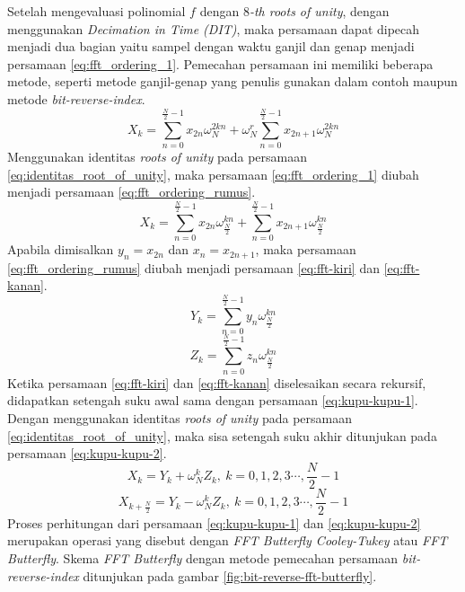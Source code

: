 Setelah mengevaluasi polinomial $ f $ dengan $8$\textit{-th roots of unity}, dengan menggunakan \textit{Decimation in Time (DIT)}, maka persamaan dapat dipecah menjadi dua bagian yaitu sampel dengan waktu ganjil dan genap menjadi persamaan \eqref{eq:fft_ordering_1}. Pemecahan persamaan ini memiliki beberapa metode, seperti metode ganjil-genap yang penulis gunakan dalam contoh maupun metode \textit{bit-reverse-index}. 
\begin{equation}
	X_k = \sum_{n=0}^{\frac{N}{2}-1} x_{2n}\omega_{N}^{2kn} + \omega_N^r \sum_{n=0}^{\frac{N}{2}-1} x_{2n+1}\omega_{N}^{2kn}
	\label{eq:fft_ordering_1}
\end{equation}
Menggunakan identitas \textit{roots of unity} pada persamaan \eqref{eq:identitas_root_of_unity}, maka persamaan \eqref{eq:fft_ordering_1} diubah menjadi persamaan \eqref{eq:fft_ordering_rumus}.
\begin{equation}
	X_k = \sum_{n=0}^{\frac{N}{2}-1} x_{2n}\omega_{\frac{N}{2}}^{kn} + \sum_{n=0}^{\frac{N}{2}-1} x_{2n+1}\omega_{\frac{N}{2}}^{kn}
	\label{eq:fft_ordering_rumus}
\end{equation}
Apabila dimisalkan $ y_n = x_{2n} $ dan $ x_n = x_{2n+1} $, maka persamaan \eqref{eq:fft_ordering_rumus} diubah menjadi persamaan \eqref{eq:fft-kiri} dan \eqref{eq:fft-kanan}.
\begin{equation}
	Y_k = \sum_{n=0}^{\frac{N}{2}-1} y_{n}\omega_{\frac{N}{2}}^{kn}
	\label{eq:fft-kiri}
\end{equation}
\begin{equation}
	Z_k = \sum_{n=0}^{\frac{N}{2}-1} z_{n}\omega_{\frac{N}{2}}^{kn}
	\label{eq:fft-kanan}
\end{equation}
Ketika persamaan \eqref{eq:fft-kiri} dan \eqref{eq:fft-kanan} diselesaikan secara rekursif, didapatkan setengah suku awal sama dengan persamaan \eqref{eq:kupu-kupu-1}. Dengan menggunakan identitas \textit{roots of unity} pada persamaan \eqref{eq:identitas_root_of_unity}, maka sisa setengah suku akhir ditunjukan pada persamaan \eqref{eq:kupu-kupu-2}.
\begin{equation}
	X_k = Y_k + \omega_{N}^{k} Z_k,\ k = 0,1,2,3 \cdots , \frac{N}{2}-1
	\label{eq:kupu-kupu-1}
\end{equation}
\begin{equation}
	X_{k+\frac{N}{2}} = Y_k - \omega_{N}^{k} Z_k,\ k = 0,1,2,3 \cdots , \frac{N}{2}-1
	\label{eq:kupu-kupu-2}
\end{equation}
Proses perhitungan dari persamaan \eqref{eq:kupu-kupu-1} dan \eqref{eq:kupu-kupu-2} merupakan operasi yang disebut dengan \textit{FFT Butterfly Cooley-Tukey} atau \textit{FFT Butterfly}. Skema \textit{FFT Butterfly} dengan metode pemecahan persamaan \textit{bit-reverse-index} ditunjukan pada gambar \ref{fig:bit-reverse-fft-butterfly}.

